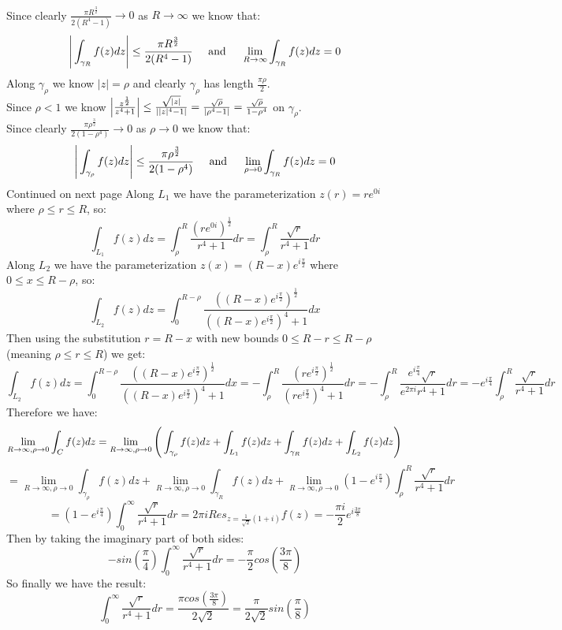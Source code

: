 \documentclass{article}
\begin{document}
\begin{center}
    \break
    \\Since clearly $\frac{\pi R^{\frac{3}{2}}}{2(R^4 - 1)}\rightarrow 0$ as $R\rightarrow\infty$ we know that:
    \[\Bigg{|}\int _{\gamma _R} f(z) dz\Bigg{|}\leq\frac{\pi R^{\frac{3}{2}}}{2(R^4 - 1)}\;\;\;\;\;\text{and}\;\;\;\;\;\lim _{R\rightarrow\infty}\int _{\gamma _R} f(z) dz = 0\]
    Along $\gamma _{\rho}$ we know $|z| =\rho$ and clearly $\gamma _{\rho}$ has length $\frac{\pi\rho}{2}$.
    \\Since $\rho < 1$ we know $\Big{|}\frac{z^{\frac{1}{2}}}{z^4 + 1}\Big{|}\leq\frac{\sqrt{|z|}}{||z|^4 - 1|} =\frac{\sqrt{\rho}}{|\rho ^4 - 1|} =\frac{\sqrt{\rho}}{1 -\rho ^4}$ on $\gamma _{\rho}$.
    \break
    \\Since clearly $\frac{\pi \rho ^{\frac{3}{2}}}{2(1 -\rho ^4)}\rightarrow 0$ as $\rho\rightarrow 0$ we know that:
    \[\Bigg{|}\int _{\gamma _{\rho}} f(z) dz\Bigg{|}\leq\frac{\pi \rho ^{\frac{3}{2}}}{2(1 -\rho ^4)}\;\;\;\;\;\text{and}\;\;\;\;\;\lim _{\rho\rightarrow 0}\int _{\gamma _R} f(z) dz = 0\]
    \break
    Continued on next page
    \newpage
    Along $L_1$ we have the parameterization $z(r) = re^{0i}$ where $\rho\leq r\leq R$, so:
    \[\int _{L_1} f(z) dz =\int _{\rho}^R\frac{(re^{0i})^{\frac{1}{2}}}{r^4 + 1} dr =\int _{\rho}^R\frac{\sqrt{r}}{r^4 + 1} dr\]
    Along $L_2$ we have the parameterization $z(x) = (R - x)e^{i\frac{\pi}{2}}$ where $0\leq x\leq R -\rho$, so:
    \[\int _{L_2} f(z) dz =\int _0^{R-\rho}\frac{((R - x)e^{i\frac{\pi}{2}})^{\frac{1}{2}}}{((R-x)e^{i\frac{\pi}{2}})^4 + 1} dx\]
    Then using the substitution $r = R - x$ with new bounds $0\leq R - r\leq R -\rho$ (meaning $\rho\leq r\leq R$) we get:
    \[\int _{L_2} f(z) dz =\int _0^{R-\rho}\frac{((R - x)e^{i\frac{\pi}{2}})^{\frac{1}{2}}}{((R-x)e^{i\frac{\pi}{2}})^4 + 1} dx = -\int _{\rho}^R\frac{(re^{i\frac{\pi}{2}})^{\frac{1}{2}}}{(re^{i\frac{\pi}{2}})^4 + 1} dr = -\int _{\rho}^R\frac{e^{i\frac{\pi}{4}}\sqrt{r}}{e^{2\pi i}r^4 + 1} dr = -e^{i\frac{\pi}{4}}\int _{\rho}^R\frac{\sqrt{r}}{r^4 + 1} dr\]
    Therefore we have:
    \[\lim _{R\rightarrow\infty,\rho\rightarrow 0}\int _C f(z) dz =\lim _{R\rightarrow\infty,\rho\rightarrow 0}\Bigg{(}\int _{\gamma _{\rho}} f(z) dz +\int _{L_1} f(z) dz +\int _{\gamma _R} f(z) dz +\int _{L_2} f(z) dz\Bigg{)}\]
    \[=\lim _{R\rightarrow\infty,\rho\rightarrow 0}\int _{\gamma _{\rho}} f(z) dz +\lim _{R\rightarrow\infty,\rho\rightarrow 0}\int _{\gamma _R} f(z) dz +\lim _{R\rightarrow\infty,\rho\rightarrow 0} (1 - e^{i\frac{\pi}{4}})\int _{\rho}^R\frac{\sqrt{r}}{r^4 + 1} dr\]
    \[= (1 - e^{i\frac{\pi}{4}})\int _0^{\infty}\frac{\sqrt{r}}{r^4 + 1} dr = 2\pi i Res_{z =\frac{1}{\sqrt{2}}(1 + i)} f(z) = -\frac{\pi i}{2} e^{i\frac{3\pi}{8}}\]
    Then by taking the imaginary part of both sides:
    \[-sin(\frac{\pi}{4})\int _0^{\infty}\frac{\sqrt{r}}{r^4 + 1} dr = -\frac{\pi}{2} cos(\frac{3\pi}{8})\]
    So finally we have the result:
    \[\int _0^{\infty}\frac{\sqrt{r}}{r^4 + 1} dr =\frac{\pi cos(\frac{3\pi}{8})}{2\sqrt{2}} =\frac{\pi}{2\sqrt{2}} sin(\frac{\pi}{8})\]
\end{center}
\end{document}
